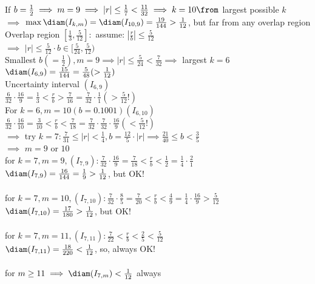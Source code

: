 \begin{itemize}
    If $b=\frac{1}{2} \implies m=9 \implies |r|\le \frac{1}{7}<\frac{11}{32} \implies k=10 \from$ largest possible $k$ \\
    $\implies$ $\max \diam (I_{k,m})=\diam(I_{10,9})=\frac{19}{144}>\frac{1}{12}$, but far from any overlap region \\
    Overlap region $[\frac{1}{3},\frac{5}{12}]:$ assume: $|\frac{r}{b}|\le \frac{5}{12}$ \\
    $\implies$ $|r|\le \frac{5}{12}\cdot b\in [\frac{5}{24},\frac{5}{12})$ \\
    Smallest $b(=\frac{1}{2}), m=9 \implies |r|\le \frac{5}{24}<\frac{7}{32} \implies$ largest $k=6$ \\
    $\diam(I_{6,9})=\frac{15}{144}=\frac{5}{48}(>\frac{1}{12})$ \\
   
    Uncertainty interval $(I_{6,9})$ \\
    $\frac{6}{32}\cdot \frac{16}{9}=\frac{1}{3}<\frac{r}{b}>\frac{7}{16}=\frac{7}{32}\cdot \frac{1}{1}(>\frac{5}{12}!)$ \\
    For $k=6, m=10 (b=0.1001) (I_{6,10})$ \\
    $\frac{6}{32}\cdot \frac{16}{10}=\frac{3}{10}<\frac{r}{b}<\frac{7}{18}=\frac{7}{32}\cdot \frac{7}{32}\cdot \frac{16}{9}(<\frac{5}{12}!)$ \\
   
    $\implies$ try $k=7: \frac{7}{31}\le |r| <\frac{1}{4}, b=\frac{12}{5}\cdot |r| \implies \frac{21}{40}\le b<\frac{3}{5}$ \\
    $\implies$ $m=9$ or $10$ \\
   
    for $k=7,m=9, (I_{7,9}): \frac{7}{32}\cdot \frac{16}{9}=\frac{7}{18}<\frac{r}{b}<\frac{1}{2}=\frac{1}{4}\cdot \frac{2}{1}$ \\
    $\diam(I_{7,9})=\frac{16}{144}=\frac{1}{9}>\frac{1}{12}$, but OK!\\
    \\
    for $k=7,m=10, (I_{7,10}): \frac{7}{32}\cdot \frac{8}{5}=\frac{7}{20}<\frac{r}{b}<\frac{4}{9}=\frac{1}{4}\cdot \frac{16}{9}>\frac{5}{12}$ \\
    $\diam(I_{7,10})=\frac{17}{180}>\frac{1}{12}$, but OK!\\
    \\
    for $k=7,m=11, (I_{7,11}): \frac{7}{22}<\frac{r}{b}<\frac{2}{5}<\frac{5}{12}$ \\
    $\diam(I_{7,11})=\frac{18}{220}<\frac{1}{12}$, so, always OK!\\
    \\
    for $m\ge 11 \implies \diam(I_{7,m})<\frac{1}{12}$ always \\
   

\end{itemize}
